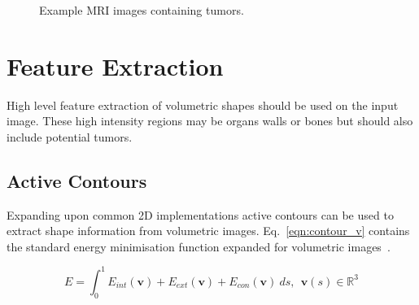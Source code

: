 \documentclass[journal]{IEEEtran}
\begin{document}
\begin{figure}
	\centering
\caption{Example MRI images containing tumors.}
\label{fig:ex}
\end{figure}












\section{Feature Extraction}
\label{sec:extraction}

High level feature extraction of volumetric shapes should be used on the input image.
These high intensity regions may be organs walls or bones but should also include potential tumors.

\subsection{Active Contours}

Expanding upon common 2D implementations active contours can be used to extract shape information from volumetric images.
Eq.~\eqref{eqn:contour_v} contains the standard energy minimisation function expanded for volumetric images~\cite{nixon02feature,skalski13automatic}. 

\begin{equation}
	E = \int_0^{1} E_{int}(\mathbf{v}) + E_{ext}(\mathbf{v}) + E_{con}(\mathbf{v})\:ds,\:\:\mathbf{v}(s) \in \mathbb{R}^3
	\label{eqn:contour_v}
\end{equation}
\end{document}
